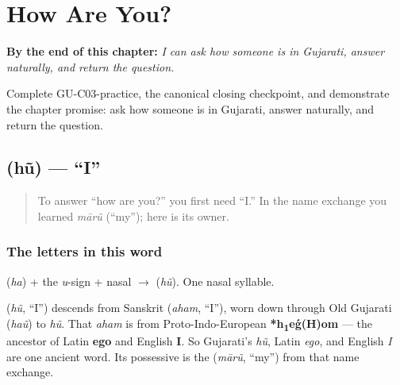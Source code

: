 
\chapter{How Are You?}
\label{ch:responding}

\begin{chapteropening}
\textbf{By the end of this chapter:} \emph{I can ask how someone is in Gujarati, answer naturally, and return the question.}

Complete GU-C03-practice, the canonical closing checkpoint, and demonstrate the chapter promise: ask how someone is in Gujarati, answer naturally, and return the question.
\end{chapteropening}

\section[\texorpdfstring{\gu{હું} (hũ)}{હું (hũ)}]{ (hũ) — \textquotedblleft{}I\textquotedblright{}}

\label{lesson:GU-C03-hun}



\begin{quote}
To answer \textquotedblleft{}how are you?\textquotedblright{} you first need \textquotedblleft{}I.\textquotedblright{} In the name exchange you learned \emph{mārũ} (\textquotedblleft{}my\textquotedblright{}); here is its owner.
\end{quote}

\subsection*{The letters in this word}
\textbf{} (\emph{ha}) + the \emph{u}-sign + nasal $\to$ \textbf{} (\emph{hũ}). One nasal syllable.

\begin{cousinweb}
\textbf{} (\emph{hũ}, \textquotedblleft{}I\textquotedblright{}) descends from Sanskrit \textbf{} (\emph{aham}, \textquotedblleft{}I\textquotedblright{}), worn down through Old Gujarati (\emph{haũ}) to \emph{hũ}. That \emph{aham} is from Proto-Indo-European \textbf{*h\textsubscript{1}eǵ(H)om} — the ancestor of Latin \textbf{ego} and English \textbf{I}. So Gujarati's \emph{hũ}, Latin \emph{ego}, and English \emph{I} are one ancient word. Its possessive is the \textbf{} (\emph{mārũ}, \textquotedblleft{}my\textquotedblright{}) from that name exchange.
\end{cousinweb}

